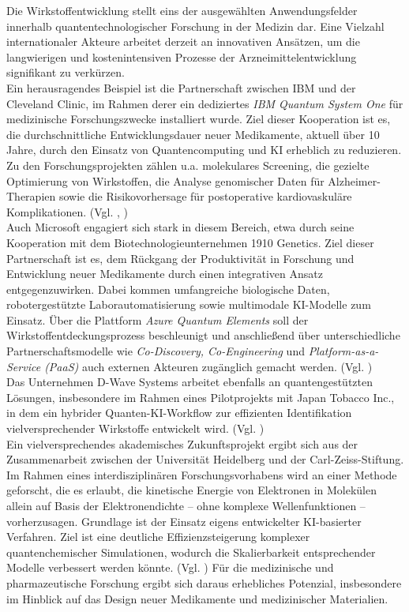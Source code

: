 Die Wirkstoffentwicklung stellt eins der ausgewählten Anwendungsfelder innerhalb quantentechnologischer Forschung in der Medizin dar. Eine Vielzahl internationaler Akteure arbeitet derzeit an innovativen Ansätzen, um die langwierigen und kostenintensiven Prozesse der Arzneimittelentwicklung signifikant zu verkürzen.\\

Ein herausragendes Beispiel ist die Partnerschaft zwischen IBM und der Cleveland Clinic, im Rahmen derer ein dediziertes \textit{IBM Quantum System One} für medizinische Forschungszwecke installiert wurde. Ziel dieser Kooperation ist es, die durchschnittliche Entwicklungsdauer neuer Medikamente, aktuell über 10 Jahre, durch den Einsatz von Quantencomputing und KI erheblich zu reduzieren. Zu den Forschungsprojekten zählen u.a. molekulares Screening, die gezielte Optimierung von Wirkstoffen, die Analyse genomischer Daten für Alzheimer-Therapien sowie die Risikovorhersage für postoperative kardiovaskuläre Komplikationen. (Vgl. \cite{noauthor_cleveland_2023}, \cite{flotherHowQuantumComputing2025})\\

Auch Microsoft engagiert sich stark in diesem Bereich, etwa durch seine Kooperation mit dem Biotechnologieunternehmen 1910 Genetics. Ziel dieser Partnerschaft ist es, dem Rückgang der Produktivität in Forschung und Entwicklung neuer Medikamente durch einen integrativen Ansatz entgegenzuwirken. Dabei kommen umfangreiche biologische Daten, robotergestützte Laborautomatisierung sowie multimodale KI-Modelle zum Einsatz. Über die Plattform \textit{Azure Quantum Elements} soll der Wirkstoffentdeckungsprozess beschleunigt und anschließend über unterschiedliche Partnerschaftsmodelle wie \textit{Co-Discovery, Co-Engineering }und\textit{ Platform-as-a-Service (PaaS)} auch externen Akteuren zugänglich gemacht werden. (Vgl. \cite{alamMicrosoft1910Genetics2024})\\

Das Unternehmen D-Wave Systems arbeitet ebenfalls an quantengestützten Lösungen, insbesondere im Rahmen eines Pilotprojekts mit Japan Tobacco Inc., in dem ein hybrider Quanten-KI-Workflow zur effizienten Identifikation vielversprechender Wirkstoffe entwickelt wird. (Vgl. \cite{JapanTobaccoInc2024})\\

Ein vielversprechendes akademisches Zukunftsprojekt ergibt sich aus der Zusammenarbeit zwischen der Universität Heidelberg und der Carl-Zeiss-Stiftung. Im Rahmen eines interdisziplinären Forschungsvorhabens wird an einer Methode geforscht, die es erlaubt, die kinetische Energie von Elektronen in Molekülen allein auf Basis der Elektronendichte – ohne komplexe Wellenfunktionen – vorherzusagen. Grundlage ist der Einsatz eigens entwickelter KI-basierter Verfahren. Ziel ist eine deutliche Effizienzsteigerung komplexer quantenchemischer Simulationen, wodurch die Skalierbarkeit entsprechender Modelle verbessert werden könnte.  (Vgl. \cite{noauthor_mithilfe_2025}) Für die medizinische und pharmazeutische Forschung ergibt sich daraus erhebliches Potenzial, insbesondere im Hinblick auf das Design neuer Medikamente und medizinischer Materialien.\\

